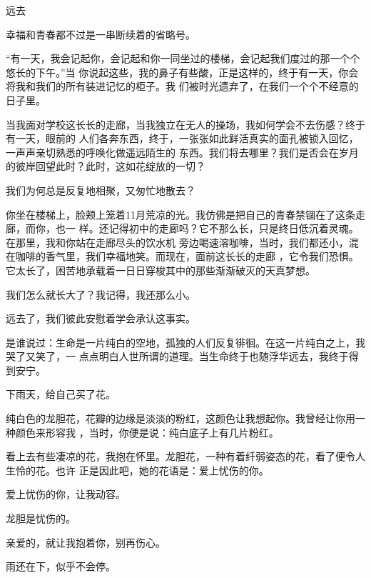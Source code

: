 \documentclass[12pt,a4paper]{article}
\def\blankrev{\vspace{1ex}}									%
\newcommand{\subpart}[1]{
	\begingroup \par
	\vspace{1ex} \centering #1
	\par \endgroup
}
\begin{document}
	\endwriting



		\subpart{远去}
		幸福和青春都不过是一串断续着的省略号。

		\blankrev
		“有一天，我会记起你，会记起和你一同坐过的楼梯，会记起我们度过的那一个个悠长的下午。”当
	你说起这些，我的鼻子有些酸，正是这样的，终于有一天，你会将我和我们的所有装进记忆的柜子。我
	们被时光遗弃了，在我们一个个不经意的日子里。

		当我面对学校这长长的走廊，当我独立在无人的操场，我如何学会不去伤感？终于有一天，眼前的
	人们各奔东西，终于，一张张如此鲜活真实的面孔被锁入回忆，一声声亲切熟悉的呼唤化做遥远陌生的
	东西。我们将去哪里？我们是否会在岁月的彼岸回望此时？此时，这如花绽放的一切？

		我们为何总是反复地相聚，又匆忙地散去？

		你坐在楼梯上，脸颊上笼着11月荒凉的光。我仿佛是把自己的青春禁锢在了这条走廊，而你，也一
	样。还记得初中的走廊吗？它不那么长，只是终日低沉着灵魂。在那里，我和你站在走廊尽头的饮水机
	旁边喝速溶咖啡，当时，我们都还小，混在咖啡的香气里，我们幸福地笑。而现在，面前这长长的走廊
	，它令我们恐惧。它太长了，困苦地承载着一日日穿梭其中的那些渐渐破灭的天真梦想。

		我们怎么就长大了？我记得，我还那么小。

		远去了，我们彼此安慰着学会承认这事实。

		是谁说过：生命是一片纯白的空地，孤独的人们反复徘徊。在这一片纯白之上，我哭了又笑了，一
	点点明白人世所谓的道理。当生命终于也随浮华远去，我终于得到安宁。

	\endwriting



		下雨天，给自己买了花。

		纯白色的龙胆花，花瓣的边缘是淡淡的粉红，这颜色让我想起你。我曾经让你用一种颜色来形容我
	，当时，你便是说：纯白底子上有几片粉红。

		看上去有些凄凉的花，我抱在怀里。龙胆花，一种有着纤弱姿态的花，看了便令人生怜的花。也许
	正是因此吧，她的花语是：爱上忧伤的你。

		爱上忧伤的你，让我动容。

		龙胆是忧伤的。

		亲爱的，就让我抱着你，别再伤心。

		雨还在下，似乎不会停。

	\endwriting


\end{document}

